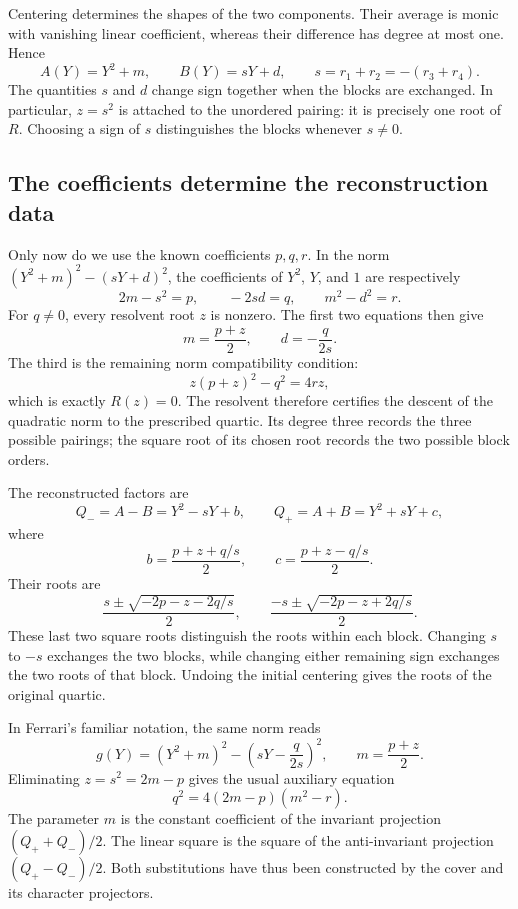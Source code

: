 \documentclass[11pt]{article}
\theoremstyle{remark}
\begin{document}
Centering determines the shapes of the two components. Their average is monic with vanishing linear coefficient, whereas their difference has degree at most one. Hence
\[
A(Y)=Y^2+m,\qquad B(Y)=sY+d,
\qquad s=r_1+r_2=-(r_3+r_4).
\]
The quantities \(s\) and \(d\) change sign together when the blocks are exchanged. In particular, \(z=s^2\) is attached to the unordered pairing: it is precisely one root of \(R\). Choosing a sign of \(s\) distinguishes the blocks whenever \(s\ne0\).

\subsection{The coefficients determine the reconstruction data}

Only now do we use the known coefficients \(p,q,r\). In the norm \((Y^2+m)^2-(sY+d)^2\), the coefficients of \(Y^2\), \(Y\), and \(1\) are respectively
\[
2m-s^2=p,\qquad -2sd=q,\qquad m^2-d^2=r.
\]
For \(q\ne0\), every resolvent root \(z\) is nonzero. The first two equations then give
\[
m=\frac{p+z}{2},\qquad d=-\frac{q}{2s}.
\]
The third is the remaining norm compatibility condition:
\[
z(p+z)^2-q^2=4rz,
\]
which is exactly \(R(z)=0\). The resolvent therefore certifies the descent of the quadratic norm to the prescribed quartic. Its degree three records the three possible pairings; the square root of its chosen root records the two possible block orders.

The reconstructed factors are
\[
Q_-=A-B=Y^2-sY+b,\qquad
Q_+=A+B=Y^2+sY+c,
\]
where
\begin{equation}
b=\frac{p+z+q/s}{2},\qquad
c=\frac{p+z-q/s}{2}.
\label{eq:quadratic-factors}
\end{equation}
Their roots are
\begin{equation}
\frac{s\pm\sqrt{-2p-z-2q/s}}{2},\qquad
\frac{-s\pm\sqrt{-2p-z+2q/s}}{2}.
\label{eq:ferrari-final}
\end{equation}
These last two square roots distinguish the roots within each block. Changing \(s\) to \(-s\) exchanges the two blocks, while changing either remaining sign exchanges the two roots of that block. Undoing the initial centering gives the roots of the original quartic.

In Ferrari's familiar notation, the same norm reads
\begin{equation}
g(Y)=(Y^2+m)^2-\left(sY-\frac{q}{2s}\right)^2,
\qquad m=\frac{p+z}{2}.
\label{eq:ferrari-square}
\end{equation}
Eliminating \(z=s^2=2m-p\) gives the usual auxiliary equation
\[
q^2=4(2m-p)(m^2-r).
\]
The parameter \(m\) is the constant coefficient of the invariant projection \((Q_++Q_-)/2\). The linear square is the square of the anti-invariant projection \((Q_+-Q_-)/2\). Both substitutions have thus been constructed by the cover and its character projectors.
\end{document}
